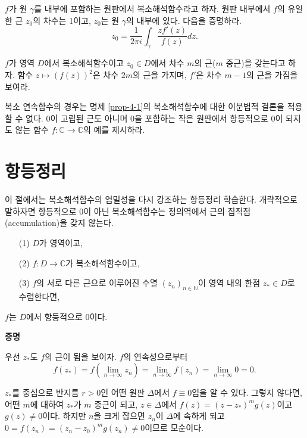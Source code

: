 \begin{salt_exercise} \label{ex-4-19}
$f$가 원 $\gamma$를 내부에 포함하는 원판에서 복소해석함수라고 하자.
원판 내부에서 $f$의 유일한 근 $z_0$의 차수는 1이고,
$z_0$는 원 $\gamma$의 내부에 있다.
다음을 증명하라.
\[
z_0 = \dfrac1{2\pi i} \int_\gamma \dfrac{zf'(z)}{f(z)} dz.
\]
\end{salt_exercise}

\begin{salt_exercise} \label{ex-4-20}
$f$가 영역 $D$에서 복소해석함수이고 $z_0\in D$에서
차수 $m$의 근($m$ 중근)을 갖는다고 하자.
함수 $z \mapsto (f(z))^2$은 차수 $2m$의 근을 가지며,
$f'$은 차수 $m-1$의 근을 가짐을 보여라.
\end{salt_exercise}

\begin{salt_exercise} \label{ex-4-21}
복소 연속함수의 경우는 명제 \ref{prop-4-1}의 복소해석함수에 대한
이분법적 결론을 적용할 수 없다. 
$0$이  고립된 근도 아니며 $0$을 포함하는 작은 원판에서  
항등적으로 $0$이 되지도 않는 함수 $f:\mathbb C \to \mathbb C$의 예를 제시하라.
\end{salt_exercise}

\section{항등정리}

이 절에서는 복소해석함수의 엄밀성을 다시 강조하는 항등정리 학습한다.
개략적으로 말하자면
항등적으로 $0$이 아닌 복소해석함수는 정의역에서 근의 집적점(accumulation)을 갖지 않는다.

\begin{salttheorem}{}{} \label{thm-4-5}
\begin{itemize}
\item[(1)] $D$가 영역이고,
\item[(2)] $f:D\to\mathbb C$가 복소해석함수이고,
\item[(3)] $f$의 서로 다른 근으로 이루어진 수열 $(z_n)_{n\in\mathbb N}$이 
영역 내의 한점 $z_*\in D$로 수렴한다면,
\end{itemize}
$f$는 $D$에서 항등적으로 $0$이다.
\end{salttheorem}

{\bf 증명}

우선 $z_*$도 $f$의 근이 됨을 보이자.
$f$의 연속성으로부터
\[
f(z_*) = f\left(\lim_{n\to\infty} z_n \right) = \lim_{n\to\infty}f( z_n) 
= \lim_{n\to\infty} 0 = 0.
\]

$z_*$를 중심으로 반지름 $r>0$인 어떤 원판 $\Delta$에서 $f\equiv0$임을 알 수 있다.
그렇지 않다면, 어떤 $m$에 대하여 $z_*$가 $m$ 중근이 되고,
$z\in \Delta$에서
$f(z)=(z-z_*)^mg(z)$이고 $g(z)\ne0$이다.
하지만 $n$을 크게 잡으면 $z_n$이 $\Delta$에 속하게 되고
$0 = f(z_n) = (z_n-z_0)^m g(z_n) \ne 0$이므로 모순이다.

